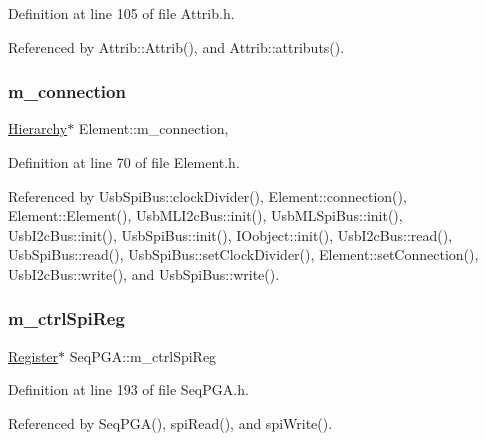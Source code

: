 Definition at line 105 of file Attrib.\+h.



Referenced by Attrib\+::\+Attrib(), and Attrib\+::attributs().

\mbox{\label{classElement_abe3de7a5dbbc9a6dd2d7e012e5fdb266}} 
\subsubsection{\texorpdfstring{m\+\_\+connection}{m\_connection}}
{\footnotesize\ttfamily \hyperlink{classHierarchy}{Hierarchy}$\ast$ Element\+::m\+\_\+connection\hspace{0.3cm}{\ttfamily [protected]}, {\ttfamily [inherited]}}



Definition at line 70 of file Element.\+h.



Referenced by Usb\+Spi\+Bus\+::clock\+Divider(), Element\+::connection(), Element\+::\+Element(), Usb\+M\+L\+I2c\+Bus\+::init(), Usb\+M\+L\+Spi\+Bus\+::init(), Usb\+I2c\+Bus\+::init(), Usb\+Spi\+Bus\+::init(), I\+Oobject\+::init(), Usb\+I2c\+Bus\+::read(), Usb\+Spi\+Bus\+::read(), Usb\+Spi\+Bus\+::set\+Clock\+Divider(), Element\+::set\+Connection(), Usb\+I2c\+Bus\+::write(), and Usb\+Spi\+Bus\+::write().

\mbox{\label{classSeqPGA_ab6597288860f5172540059345256f9a9}} 
\subsubsection{\texorpdfstring{m\+\_\+ctrl\+Spi\+Reg}{m\_ctrlSpiReg}}
{\footnotesize\ttfamily \hyperlink{classRegister}{Register}$\ast$ Seq\+P\+G\+A\+::m\+\_\+ctrl\+Spi\+Reg\hspace{0.3cm}{\ttfamily [private]}}



Definition at line 193 of file Seq\+P\+G\+A.\+h.



Referenced by Seq\+P\+G\+A(), spi\+Read(), and spi\+Write().

\mbox{\label{classSeqPGA_afcef519379e9c6ba624ba58a4eac79f1}} 
